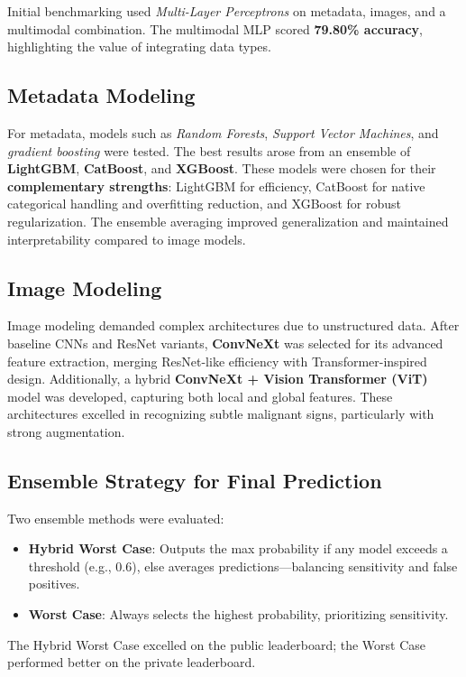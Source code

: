 \documentclass[11pt,a4paper]{article}
\begin{document}
Initial benchmarking used \textit{Multi-Layer Perceptrons} on metadata, images, and a multimodal combination. The multimodal MLP scored \textbf{79.80\% accuracy}, highlighting the value of integrating data types.

\subsection{Metadata Modeling}

For metadata, models such as \textit{Random Forests}, \textit{Support Vector Machines}, and \textit{gradient boosting} were tested. The best results arose from an ensemble of \textbf{LightGBM}, \textbf{CatBoost}, and \textbf{XGBoost}. These models were chosen for their \textbf{complementary strengths}: LightGBM for efficiency, CatBoost for native categorical handling and overfitting reduction, and XGBoost for robust regularization. The ensemble averaging improved generalization and maintained interpretability compared to image models.

\subsection{Image Modeling}

Image modeling demanded complex architectures due to unstructured data. After baseline CNNs and ResNet variants, \textbf{ConvNeXt} was selected for its advanced feature extraction, merging ResNet-like efficiency with Transformer-inspired design. Additionally, a hybrid \textbf{ConvNeXt + Vision Transformer (ViT)} model was developed, capturing both local and global features. These architectures excelled in recognizing subtle malignant signs, particularly with strong augmentation.

\subsection{Ensemble Strategy for Final Prediction}

Two ensemble methods were evaluated:
\begin{itemize}
  \item \textbf{Hybrid Worst Case}: Outputs the max probability if any model exceeds a threshold (e.g., 0.6), else averages predictions—balancing sensitivity and false positives.
  \item \textbf{Worst Case}: Always selects the highest probability, prioritizing sensitivity.
\end{itemize}
The Hybrid Worst Case excelled on the public leaderboard; the Worst Case performed better on the private leaderboard.
\end{document}

